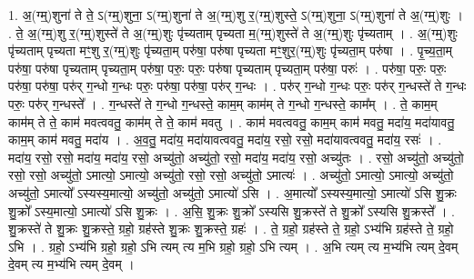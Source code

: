 \documentclass[17pt]{extarticle}
\begin{document}
1. अ॒(ग्म्॒)शुना॑ ते ते॒ ऽ(ग्म्॒)शुना॒ ऽ(ग्म्॒)शुना॑ ते अ॒(ग्म्॒)शु र॒(ग्म्॒)शुस्ते॒ ऽ(ग्म्॒)शुना॒ ऽ(ग्म्॒)शुना॑ ते अ॒(ग्म्॒)शुः । . ते॒ अ॒(ग्म्॒)शु र॒(ग्म्॒)शुस्ते॑ ते अ॒(ग्म्॒)शुः पृ॑च्यताम् पृच्यता म॒(ग्म्॒)शुस्ते॑ ते अ॒(ग्म्॒)शुः पृ॑च्यताम् । . अ॒(ग्म्॒)शुः पृ॑च्यताम् पृच्यता मꣳ॒॒शु र॒(ग्म्॒)शुः पृ॑च्यता॒म् परु॑षा॒ परु॑षा पृच्यता मꣳ॒॒शुर॒(ग्म्॒)शुः पृ॑च्यता॒म् परु॑षा । . पृ॒च्य॒ता॒म् परु॑षा॒ परु॑षा पृच्यताम् पृच्यता॒म् परु॑षा॒ परुः॒ परुः॒ परु॑षा पृच्यताम् पृच्यता॒म् परु॑षा॒ परुः॑ । . परु॑षा॒ परुः॒ परुः॒ परु॑षा॒ परु॑षा॒ परु॑र् ग॒न्धो ग॒न्धः परुः॒ परु॑षा॒ परु॑षा॒ परु॑र् ग॒न्धः । . परु॑र् ग॒न्धो ग॒न्धः परुः॒ परु॑र् ग॒न्धस्ते॑ ते ग॒न्धः परुः॒ परु॑र् ग॒न्धस्ते᳚ । . ग॒न्धस्ते॑ ते ग॒न्धो ग॒न्धस्ते॒ काम॒म् काम॑म् ते ग॒न्धो ग॒न्धस्ते॒ काम᳚म् । . ते॒ काम॒म् काम॑म् ते ते॒ काम॑ मवत्ववतु॒ काम॑म् ते ते॒ काम॑ मवतु । . काम॑ मवत्ववतु॒ काम॒म् काम॑ मवतु॒ मदा॑य॒ मदा॑यावतु॒ काम॒म् काम॑ मवतु॒ मदा॑य । . अ॒व॒तु॒ मदा॑य॒ मदा॑यावत्ववतु॒ मदा॑य॒ रसो॒ रसो॒ मदा॑यावत्ववतु॒ मदा॑य॒ रसः॑ । . मदा॑य॒ रसो॒ रसो॒ मदा॑य॒ मदा॑य॒ रसो॒ अच्यु॑तो॒ अच्यु॑तो॒ रसो॒ मदा॑य॒ मदा॑य॒ रसो॒ अच्यु॑तः । . रसो॒ अच्यु॑तो॒ अच्यु॑तो॒ रसो॒ रसो॒ अच्यु॑तो॒ ऽमात्यो॒ ऽमात्यो॒ अच्यु॑तो॒ रसो॒ रसो॒ अच्यु॑तो॒ ऽमात्यः॑ । . अच्यु॑तो॒ ऽमात्यो॒ ऽमात्यो॒ अच्यु॑तो॒ अच्यु॑तो॒ ऽमात्यो᳚ ऽस्यस्य॒मात्यो॒ अच्यु॑तो॒ अच्यु॑तो॒ ऽमात्यो॑ ऽसि । . अ॒मात्यो᳚ ऽस्यस्य॒मात्यो॒ ऽमात्यो॑ ऽसि शु॒क्रः शु॒क्रो᳚ ऽस्य॒मात्यो॒ ऽमात्यो॑ ऽसि शु॒क्रः । . अ॒सि॒ शु॒क्रः शु॒क्रो᳚ ऽस्यसि शु॒क्रस्ते॑ ते शु॒क्रो᳚ ऽस्यसि शु॒क्रस्ते᳚ । . शु॒क्रस्ते॑ ते शु॒क्रः शु॒क्रस्ते॒ ग्रहो॒ ग्रह॑स्ते शु॒क्रः शु॒क्रस्ते॒ ग्रहः॑ । . ते॒ ग्रहो॒ ग्रह॑स्ते ते॒ ग्रहो॒ ऽभ्य॑भि ग्रह॑स्ते ते॒ ग्रहो॒ ऽभि । . ग्रहो॒ ऽभ्य॑भि ग्रहो॒ ग्रहो॒ ऽभि त्यम् त्य म॒भि ग्रहो॒ ग्रहो॒ ऽभि त्यम् । . अ॒भि त्यम् त्य म॒भ्य॑भि त्यम् दे॒वम् दे॒वम् त्य म॒भ्य॑भि त्यम् दे॒वम् । \newline
\end{document}
